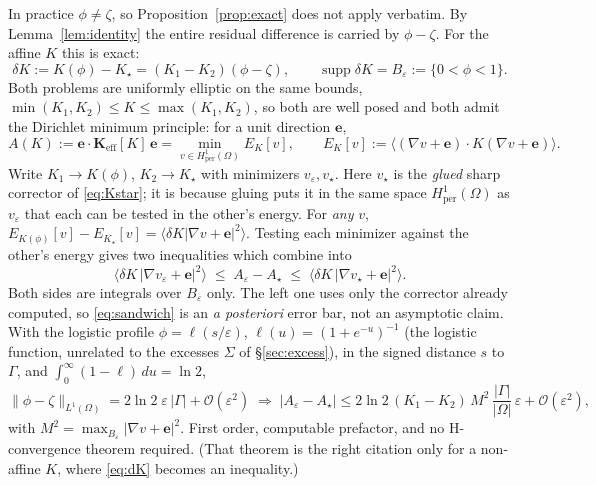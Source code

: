 \documentclass[11pt]{article}
\newcommand{\Om}{\Omega}
\newcommand{\Gam}{\Gamma}
\newcommand{\be}{\mathbf e}
\newcommand{\Keff}{\mathbf{K}_{\mathrm{eff}}}
\newcommand{\Hper}{H^1_{\mathrm{per}}(\Om)}
\newcommand{\avg}[1]{\big\langle #1 \big\rangle}
\newcommand{\Band}{B_\varepsilon}
\newcommand{\ind}{\zeta}  %
\begin{document}
In practice $\phi\neq\ind$, so Proposition~\ref{prop:exact} does not apply
verbatim. By Lemma~\ref{lem:identity} the entire residual difference is carried
by $\phi-\ind$. For the affine $K$ this is exact:
\begin{equation}
\delta\!K:=K(\phi)-K_\star=(K_1-K_2)(\phi-\ind),
\qquad \operatorname{supp}\delta\!K=\Band:=\{0<\phi<1\}.
\label{eq:dK}
\end{equation}
Both problems are uniformly elliptic on the same bounds, $\min(K_1,K_2)\le K\le
\max(K_1,K_2)$, so both are well posed and both admit the Dirichlet minimum
principle: for a unit direction $\be$,
\begin{equation}
A(K):=\be\cdot\Keff[K]\,\be=\min_{v\in\Hper}E_K[v],
\qquad E_K[v]:=\avg{(\nabla v+\be)\cdot K(\nabla v+\be)}.
\label{eq:dirichlet}
\end{equation}
Write $K_1^{\phantom{.}}\!\to K(\phi)$, $K_2^{\phantom{.}}\!\to K_\star$ with
minimizers $v_\varepsilon,v_\star$. Here $v_\star$ is the \emph{glued} sharp
corrector of \eqref{eq:Kstar}; it is because gluing puts it in the same space
$\Hper$ as $v_\varepsilon$ that each can be tested in the other's energy. For
\emph{any} $v$,
$E_{K(\phi)}[v]-E_{K_\star}[v]=\avg{\delta\!K|\nabla v+\be|^2}$. Testing each
minimizer against the other's energy gives two inequalities which combine into
\begin{equation}
\avg{\delta\!K\,|\nabla v_\varepsilon+\be|^2}
\;\le\;A_\varepsilon-A_\star\;\le\;
\avg{\delta\!K\,|\nabla v_\star+\be|^2}.
\label{eq:sandwich}
\end{equation}
Both sides are integrals over $\Band$ only. The left one uses only the corrector
already computed, so \eqref{eq:sandwich} is an \emph{a posteriori} error bar, not
an asymptotic claim. With the logistic profile
$\phi=\ell(s/\varepsilon)$, $\ell(u)=(1+e^{-u})^{-1}$ (the logistic
function, unrelated to the excesses $\Sigma$ of \S\ref{sec:excess}), in the signed
distance $s$ to $\Gam$, and $\int_0^\infty(1-\ell)\,du=\ln2$,
\begin{equation}
\|\phi-\ind\|_{L^1(\Om)}=2\ln\!2\;\varepsilon\,|\Gam|+\mathcal O(\varepsilon^2)
\;\Longrightarrow\;
\big|A_\varepsilon-A_\star\big|\le
2\ln\!2\,(K_1-K_2)\,M^2\,\frac{|\Gam|}{|\Om|}\,\varepsilon+\mathcal O(\varepsilon^2),
\label{eq:rate}
\end{equation}
with $M^2=\max_{\Band}|\nabla v+\be|^2$. First order, computable prefactor, and
no H-convergence theorem required. (That theorem is the right citation only for
a non-affine $K$, where \eqref{eq:dK} becomes an inequality.)
\end{document}
